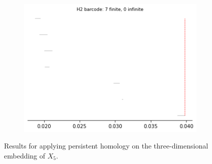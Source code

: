 \begin{figure}[H]
\begin{subfigure}[b]{0.24\textwidth}
\includegraphics[width=\textwidth]{figures/X5_H2_barcode.png}
 \caption{}
\end{subfigure}
\caption{Results for applying persistent homology on the three-dimensional embedding of $X_5$.}
\end{figure}

